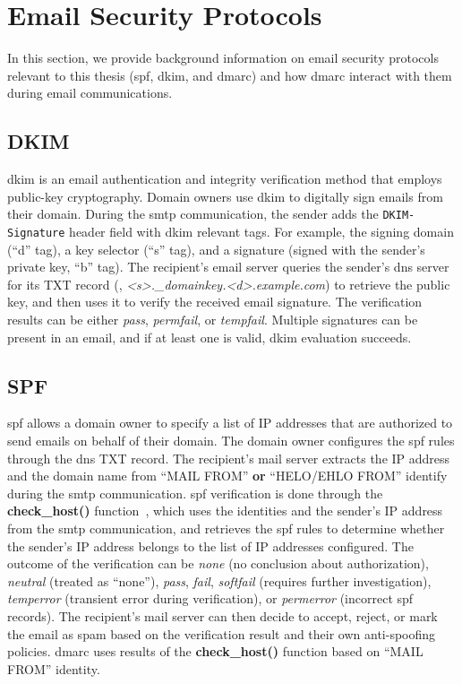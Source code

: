 \section{Email Security Protocols}
\label{sec:background-dmarc}
In this section, we provide background information on email security protocols relevant to this thesis (\gls{spf}, \gls{dkim}, and \gls{dmarc}) and how \gls{dmarc} interact with them during email communications.

\subsection{DKIM}
\acrfull{dkim} is an email authentication and integrity verification method that employs public-key cryptography. Domain owners use \gls{dkim} to digitally sign emails from their domain. During the \gls{smtp} communication, the sender adds the \texttt{DKIM-Signature} header field with \gls{dkim} relevant tags. For example, the signing domain (``d'' tag), a key selector (``s'' tag), and a signature (signed with the sender's private key, ``b'' tag).
The recipient's email server queries the sender's \gls{dns} server for its TXT record (\eg, \textit{<s>.\_domainkey.<d>.example.com}) to retrieve the public key, and then uses it to verify the received email signature. The verification results can be either \textit{pass}, \textit{permfail}, or \textit{tempfail}. Multiple signatures can be present in an email, and if at least one is valid, \gls{dkim} evaluation succeeds.

\subsection{SPF}
\acrfull{spf} allows a domain owner to specify a list of IP addresses that are authorized to send emails on behalf of their domain.
The domain owner configures the \gls{spf} rules through the \gls{dns} TXT record.
The recipient's mail server extracts the IP address and the domain name from ``MAIL FROM'' \textbf{or} ``HELO/EHLO FROM'' identify during the \gls{smtp} communication.
\gls{spf} verification is done through the \textbf{check\_host()} function~\cite{rfc7208}, which uses the identities and the sender's IP address from the \gls{smtp} communication, and retrieves the \gls{spf} rules to determine whether the sender's IP address belongs to the list of IP addresses configured.
The outcome of the verification can be \textit{none} (no conclusion about authorization), \textit{neutral} (treated as ``none''), \textit{pass}, \textit{fail}, \textit{softfail} (requires further investigation), \textit{temperror} (transient error during verification), or \textit{permerror} (incorrect \gls{spf} records).
The recipient's mail server can then decide to accept, reject, or mark the email as spam based on the verification result and their own anti-spoofing policies.
\gls{dmarc} uses results of the \textbf{check\_host()} function based on ``MAIL FROM'' identity.

